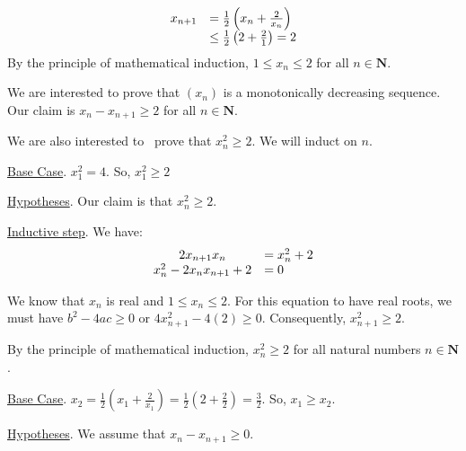 \documentclass[10pt]{article}
\begin{document}
\begin{equation*}
\begin{array}{ c l }
x_{n+1} & =\frac{1}{2}\left( x_{n} +\frac{2}{x_{n}}\right)\\
 & \leq \frac{1}{2}\left( 2+\frac{2}{1}\right) =2
\end{array}
\end{equation*}
By the principle of mathematical induction, $\displaystyle 1\leq x_{n} \leq 2$ for all $\displaystyle n\in \mathbf{N}$.



We are interested to prove that $\displaystyle ( x_{n})$ is a monotonically decreasing sequence. Our claim is $\displaystyle x_{n} -x_{n+1} \geq 2$ for all $\displaystyle n\in \mathbf{N}$.



We are also interested to \ prove that $\displaystyle x_{n}^{2} \geq 2$. We will induct on $\displaystyle n$.



\underline{Base Case}. $\displaystyle x_{1}^{2} =4$. So, $\displaystyle x_{1}^{2} \geq 2$



\underline{Hypotheses}. Our claim is that $\displaystyle x_{n}^{2} \geq 2$.



\underline{Inductive step}. We have:
\begin{equation*}
\begin{array}{ c l }
2x_{n+1} x_{n} & =x_{n}^{2} +2\\
x_{n}^{2} -2x_{n} x_{n+1} +2 & =0
\end{array}
\end{equation*}


We know that $\displaystyle x_{n}$ is real and $\displaystyle 1\leq x_{n} \leq 2$. For this equation to have real roots, we must have $\displaystyle b^{2} -4ac\geq 0$ or $\displaystyle 4x_{n+1}^{2} -4( 2) \geq 0$. Consequently, $\displaystyle x_{n+1}^{2} \geq 2$.



By the principle of mathematical induction, $\displaystyle x_{n}^{2} \geq 2$ for all natural numbers $\displaystyle n\in \mathbf{N}$.

\underline{Base Case}. $\displaystyle x_{2} =\frac{1}{2}\left( x_{1} +\frac{2}{x_{1}}\right) =\frac{1}{2}\left( 2+\frac{2}{2}\right) =\frac{3}{2}$. So, $\displaystyle x_{1} \geq x_{2}$.

\underline{Hypotheses}. We assume that $\displaystyle x_{n} -x_{n+1} \geq 0$.
\end{document}
